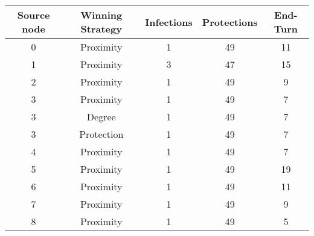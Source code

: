 \documentclass[results.tex]{subfiles}
\begin{document}
    \begin{center}
        \begin{tabular}{| c || c | c | c | c |}
            \hline
            {\bfseries Source node} & {\bfseries Winning Strategy} & {\bfseries Infections} & {\bfseries Protections}
            & {\bfseries End-Turn}
            \\  %
            \hline\hline
            0                       & Proximity                    & 1                      & 49                      & 11                   \\
            \hline
            1                       & Proximity                    & 3                      & 47                      & 15                   \\
            \hline
            2                       & Proximity                    & 1                      & 49                      & 9                    \\
            \hline
            3                       & Proximity                    & 1                      & 49                      & 7                    \\
            \hline
            3                       & Degree                       & 1                      & 49                      & 7                    \\
            \hline
            3                       & Protection                   & 1                      & 49                      & 7                    \\
            \hline
            4                       & Proximity                    & 1                      & 49                      & 7                    \\
            \hline
            5                       & Proximity                    & 1                      & 49                      & 19                   \\
            \hline
            6                       & Proximity                    & 1                      & 49                      & 11                   \\
            \hline
            7                       & Proximity                    & 1                      & 49                      & 9                    \\
            \hline
            8                       & Proximity                    & 1                      & 49                      & 5                    \\

\end{tabular}
\end{center}
\end{document}
